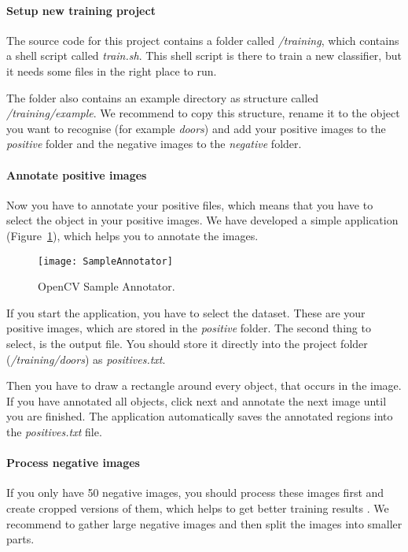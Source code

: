 \paragraph{Setup new training project}

The source code for this project contains a folder called \textit{/training}, which contains a shell script called \textit{train.sh}. This shell script is there to train a new classifier, but it needs some files in the right place to run.

The folder also contains an example directory as structure called \textit{/training/example}. We recommend to copy this structure, rename it to the object you want to recognise (for example \textit{doors}) and add your positive images to the \textit{positive} folder and the negative images to the \textit{negative} folder.

\paragraph{Annotate positive images}

Now you have to annotate your positive files, which means that you have to select the object in your positive images. We have developed a simple application (Figure~\ref{fig:SampleAnnotator}), which helps you to annotate the images.

\begin{figure}[H]
	\centering
	\texttt{[image: SampleAnnotator]}
	\caption{OpenCV Sample Annotator.}
	\label{fig:SampleAnnotator}
\end{figure}

If you start the application, you have to select the dataset. These are your positive images, which are stored in the \textit{positive} folder. The second thing to select, is the output file. You should store it directly into the project folder (\textit{/training/doors}) as \textit{positives.txt}.

Then you have to draw a rectangle around every object, that occurs in the image. If you have annotated all objects, click next and annotate the next image until you are finished. The application automatically saves the annotated regions into the \textit{positives.txt} file.


\paragraph{Process negative images}
If you only have 50 negative images, you should process these images first and create cropped versions of them, which helps to get better training results \citep{ball}. We recommend to gather large negative images and then split the images into smaller parts.

